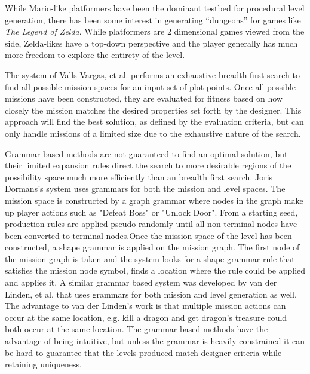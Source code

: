 \documentclass[a4paper]{article}
\begin{document}
While Mario-like platformers have been the dominant testbed for procedural level generation, there has been some interest in generating ``dungeons'' for games like \textit{The Legend of Zelda}.  While platformers are 2 dimensional games viewed from the side, Zelda-likes have a top-down perspective and the player generally has much more freedom to explore the entirety of the level.

  The system of Valls-Vargas, et al. \cite{VARGASPLOTPOINTS} performs an exhaustive breadth-first search to find all possible  mission spaces for an input set of plot points.  Once all possible missions have been constructed, they are evaluated for fitness based on how closely the mission matches the desired properties set forth by the designer.  This approach will find the best solution, as defined by the evaluation criteria, but can only handle missions of a limited size due to the exhaustive nature of the search.  

Grammar based methods are not guaranteed to find an optimal solution, but their limited expansion rules direct the search to more desirable regions of the possibility space much more efficiently than an breadth first search.  Joris Dormans's system \cite{JDADVENTURE} uses grammars for both the mission and level spaces.  The mission space is constructed 
by a graph grammar where nodes in the graph make up player actions such as "Defeat Boss" or "Unlock Door".  From a starting seed, production rules are applied pseudo-randomly until all non-terminal nodes have been converted to terminal nodes.Once the mission space of the level has been constructed, a shape grammar is applied on the mission graph.  The first node of the mission graph is taken and the system looks for a shape grammar rule that satisfies the mission node symbol, finds a location where the rule could be applied and applies it. A similar grammar based system was developed by van der Linden, et al. \cite{VDLPROCGENLEVEL}  that uses grammars for both mission and level generation as well.  The advantage to van der Linden's work is that multiple mission actions can occur at the same location, e.g. kill a dragon and get dragon's treasure could both occur at the same location.  The grammar based methods have the advantage of being intuitive, but unless the grammar is heavily constrained it can be hard to guarantee that the levels produced match designer criteria while retaining uniqueness.  
\end{document}
